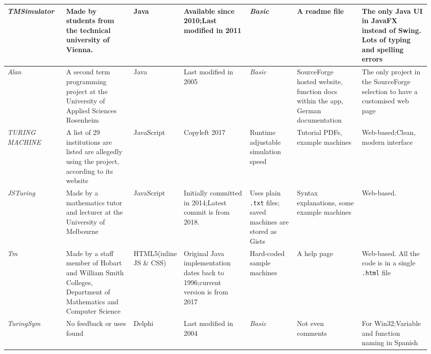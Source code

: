 \documentclass[12pt]{article}
\begin{document}
\begin{table}[h!]
\begin{tabular}{|m{0.8in} |m{1in}|m{0.5in}|m{0.8in}|m{0.8in}|m{0.6in}|m{0.8in}|}
				\textit{TMSimulator}~\cite{archonius_hugork_2010} 
					& Made by students from the technical university of Vienna. & Java & Available since 2010;\newline Last modified in 2011 & \textit{Basic} & A readme file & The only Java UI in JavaFX instead of Swing. Lots of typing and spelling errors  \\ \hline
				\textit{Alan}~\cite{neuber_pahl_seichter_2005} 
					& A second term programming project at the University of Applied Sciences Rosenheim
					& Java &Last modified in 2005  & \textit{Basic} & SourceForge hosted website, function docs within the app, German documentation & The only project in the SourceForge selection to have a customised web page \\ \hline
				\textit{TURING MACHINE}~\cite{ugarte_2017} 
					& A list of 29 institutions are listed are allegedly using the project, according to its website  & JavaScript\newline {\tiny (jQuery)}  & Copyleft 2017  & Runtime adjustable simulation speed & Tutorial PDFs, example machines  & Web-based;\newline Clean, modern interface \\ \hline
				\textit{JSTuring}~\cite{morphett} 
					& Made by a mathematics tutor and lecturer at the University of Melbourne
					& JavaScript\newline {\tiny (jQuery)} & Initially committed in 2014;\newline Latest commit is from 2018. & Uses plain \texttt{.txt} files; saved machines are stored as Gists & Syntax explanations, some example machines & Web-based. \\ \hline
				\textit{Tm}~\cite{eck} 
					& Made by a staff member of Hobart and William Smith Colleges, Department of Mathematics and Computer Science
					& HTML5\newline {\tiny (inline\newline JS \& CSS)} & Original Java implementation dates back to 1996;\newline current version is from 2017  & Hard-coded sample machines &  A help page & Web-based. All the code is in a single \texttt{.html} file \\ \hline
				\textit{TuringSym}~\cite{jmarcost_2004} 
					& No feedback or uses found  & Delphi & Last modified in 2004 & \textit{Basic}  & Not even comments & For Win32;\newline Variable and function naming in Spanish \\ \hline
			\end{tabular}
		\end{table}
\end{document}
